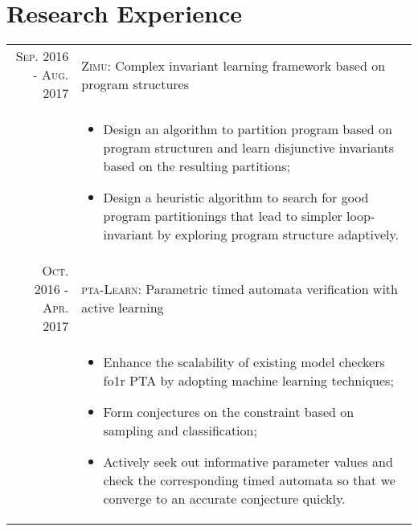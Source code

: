 \documentclass[a4paper,10pt]{article}
\begin{document}
\section{Research Experience}
\begin{tabular}{rp{11cm}}
\textsc{Sep.} 2016 - \textsc{Aug.} 2017 & \textsc{Zimu:} \footnotesize{Complex invariant learning framework based on program structures}\\
&\footnotesize{
\begin{itemize}
	\item Design an algorithm to partition program based on program structuren and learn disjunctive invariants based on the resulting partitions;
	\item Design a heuristic algorithm to search for good program partitionings that lead to simpler loop-invariant by exploring program structure adaptively.
\end{itemize}
} \\


\textsc{Oct.} 2016 - \textsc{Apr.} 2017 & \textsc{pta-Learn:} \footnotesize{Parametric timed automata verification with active learning}\\
&\footnotesize{
\begin{itemize}
	\item Enhance the scalability of existing model checkers fo1r PTA by adopting machine learning techniques;
	\item Form conjectures on the constraint based on sampling and classification; 
	\item Actively seek out informative parameter values and check the corresponding timed automata so that we converge to an accurate conjecture quickly.
\end{itemize}
} \\



\end{tabular}
\end{document}
